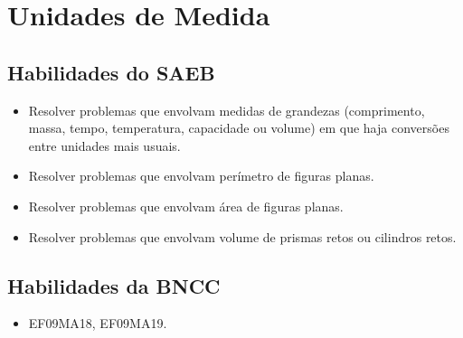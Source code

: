 \chapter{Unidades de Medida}

\section{Habilidades do SAEB}

\begin{itemize}

  \item Resolver problemas que envolvam medidas de grandezas (comprimento,
massa, tempo, temperatura, capacidade ou volume) em que haja
conversões entre unidades mais usuais. 
  \item Resolver problemas que envolvam perímetro de figuras planas. 
  \item Resolver problemas que envolvam área de figuras planas. 
  \item Resolver problemas que envolvam volume de prismas retos ou cilindros
retos.  

\end{itemize} 

\section*{Habilidades da BNCC}

\begin{itemize}
  \item EF09MA18, EF09MA19. 
\end{itemize}


